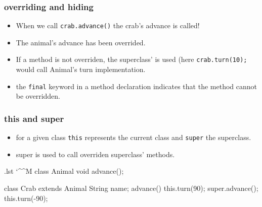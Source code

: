 \documentclass[10pt,handout]{beamer}
\makeatletter
\newenvironment{code}{%
  \begingroup
  \@bsphack
  \immediate\openout\lstvrb@out\jobname.lst
  \let\do\@makeother\dospecials\catcode`\^^M\active
  \def\verbatim@processline{%
    \immediate\write\lstvrb@out{\the\verbatim@line}}%
  \verbatim@start}{%
  \immediate\closeout\lstvrb@out
  \@esphack
  \endgroup
  
  \begin{alertblock}{}
    
  \end{alertblock}}
\makeatother
\begin{document}
\begin{frame}[fragile]
\frametitle{overriding and hiding}
\begin{itemize}
  \item When we call \verb!crab.advance()! the crab's advance is called!
  \item The animal's advance has been overrided.
  \item If a method is not overriden, the superclass' is used (here \verb!crab.turn(10);! would call Animal's turn implementation.
  \item the \alert{\verb!final!} keyword in a method declaration indicates that the method cannot be overridden.
\end{itemize}

\end{frame}

\begin{frame}
\frametitle{this and super}
  \begin{itemize}
    \item for a given class \alert{\verb!this!} represents the current class and \alert{\verb!super!} the superclass. 
    \item super is used to call overriden superclass' methods.
  \end{itemize}
  \begin{code}
class Animal {
  void advance();    
}

class Crab extends Animal{
  String name;
  advance() {
    this.turn(90);
    super.advance();
    this.turn(-90);
  }
}
\end{code}
\end{frame}
\end{document}
